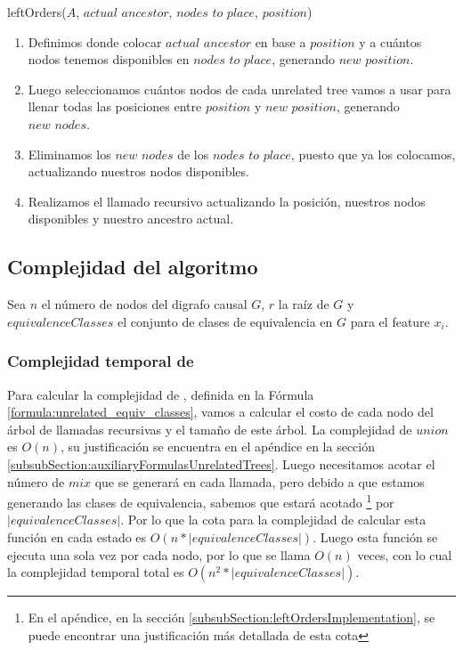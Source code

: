 \begin{algorithm}
\caption{leftOrders($A$, $\textit{actual ancestor}$, $\textit{nodes to place}$, $position$)} \label{alg:leftOrdersAlgorithm}
\begin{enumerate}
    \item Definimos donde colocar $\textit{actual ancestor}$ en base a $position$ y a cuántos nodos tenemos disponibles en $\textit{nodes to place}$, generando $\textit{new position}$.
    \item Luego seleccionamos cuántos nodos de cada unrelated tree vamos a usar para llenar todas las posiciones entre $position$ y $\textit{new position}$, generando $\textit{new nodes}$.
    \item Eliminamos los $\textit{new nodes}$ de los $\textit{nodes to place}$, puesto que ya los colocamos, actualizando nuestros nodos disponibles.
    \item Realizamos el llamado recursivo actualizando la posición, nuestros nodos disponibles y nuestro ancestro actual. 
\end{enumerate}
\end{algorithm}

\subsection{Complejidad del algoritmo}
Sea $n$ el número de nodos del digrafo causal $G$, $r$ la raíz de $G$ y $equivalenceClasses$ el conjunto de clases de equivalencia en $G$ para el feature $x_i$.

\subsubsection{Complejidad temporal de \unrEqCl}

Para calcular la complejidad de \unrEqCl, definida en la Fórmula \ref{formula:unrelated_equiv_classes}, vamos a calcular el costo de cada nodo del árbol de llamadas recursivas y el tamaño de este árbol. La complejidad de $union$ es $O(n)$, su justificación se encuentra en el apéndice en la sección \ref{subsubSection:auxiliaryFormulasUnrelatedTrees}. Luego necesitamos acotar el número de $mix$ que se generará en cada llamada, pero debido a que estamos generando las clases de equivalencia, sabemos que estará acotado \footnote{En el apéndice, en la sección \ref{subsubSection:leftOrdersImplementation}, se puede encontrar una justificación más detallada de esta cota} por $|equivalenceClasses|$. Por lo que la cota para la complejidad de calcular esta función en cada estado es $O(n * |equivalenceClasses|)$. Luego esta función se ejecuta una sola vez por cada nodo, por lo que se llama $O(n)$ veces, con lo cual la complejidad temporal total es $O(n^2 * |equivalenceClasses|)$.

